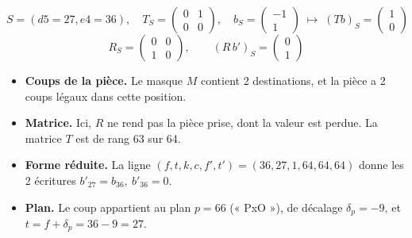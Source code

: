 \[ S = (d5=27, e4=36),\quad T_S = \begin{pmatrix}0 & 1 \\ 0 & 0\end{pmatrix},\quad b_S = \begin{pmatrix}-1 \\ 1\end{pmatrix}\;\longmapsto\; (Tb)_S =\begin{pmatrix}1 \\ 0\end{pmatrix} \]
\[ R_S = \begin{pmatrix}0 & 0 \\ 1 & 0\end{pmatrix},\qquad (R\,b')_S = \begin{pmatrix}0 \\ 1\end{pmatrix} \]
\begin{itemize}
\item \textbf{Coups de la pièce.} Le masque $M$ contient 2 destinations, et la pièce a 2 coups légaux dans cette position.
\item \textbf{Matrice.} Ici, $R$ ne rend pas la pièce prise, dont la valeur est perdue. La matrice $T$ est de rang 63 sur 64.
\item \textbf{Forme réduite.} La ligne $(f, t, k, c, f', t') = (36, 27, 1, 64, 64, 64)$ donne les 2 écritures $b'_{27} = b_{36},\ b'_{36} = 0$.
\item \textbf{Plan.} Le coup appartient au plan $p = 66$ (« PxO »), de décalage $\delta_p = -9$, et $t = f + \delta_p = 36 -9 = 27$.
\end{itemize}
